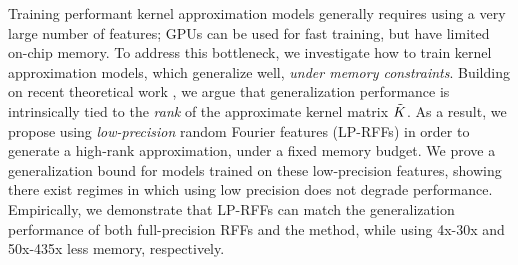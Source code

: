 
Training performant kernel approximation models generally requires using a very large number of features; GPUs can be used for fast training, but have limited on-chip memory. To address this bottleneck, we investigate how to train kernel approximation models, which generalize well, \emph{under memory constraints}.  Building on recent theoretical work \citep{avron17,musco17}, we argue that generalization performance is intrinsically tied to the \emph{rank} of the approximate kernel matrix $\tilde{K}$. As a result, we propose using \emph{low-precision} random Fourier features (LP-RFFs) in order to generate a high-rank approximation, under a fixed memory budget. We prove a generalization bound for models trained on these low-precision features, showing there exist regimes in which using low precision does not degrade performance. Empirically, we demonstrate that LP-RFFs can match the generalization performance of both full-precision RFFs and the \Nystrom method, while using 4x-30x and 50x-435x less memory, respectively.
